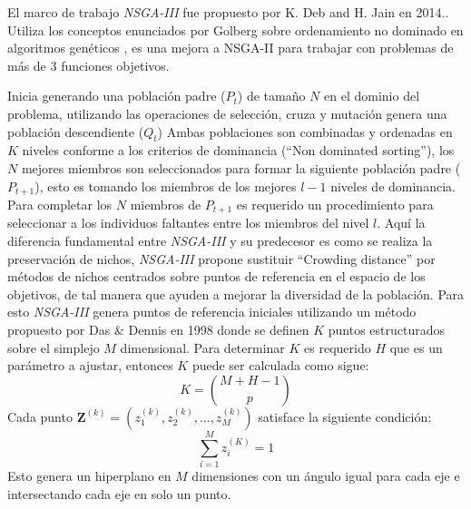\documentclass[letterpaper,10pt]{article}
\begin{document}
El marco de trabajo \emph{NSGA-III} fue propuesto por K. Deb and H. Jain en 2014.\cite{6600851}. Utiliza los conceptos enunciados por Golberg sobre ordenamiento no dominado en algoritmos genéticos \cite{goldberg1988genetic}
, es una mejora a NSGA-II para trabajar con problemas de más de $3$ funciones objetivos.

Inicia generando una población padre ($P_t$) de tamaño $N$ en el dominio del problema, utilizando las operaciones de selección, cruza y mutación genera una población descendiente ($Q_t$)
Ambas poblaciones son combinadas y ordenadas en $K$ niveles conforme a los criterios de dominancia (``Non dominated sorting''), los $N$ mejores miembros son seleccionados para formar
la siguiente población padre ($P_{t+1}$), esto es tomando los miembros de los mejores $l-1$ niveles de dominancia. Para completar los $N$ miembros de $P_{t+1}$ es requerido un procedimiento
para seleccionar a los individuos faltantes entre los miembros del nivel $l$. Aquí la diferencia fundamental entre \emph{NSGA-III} y su predecesor es como se realiza la preservación de nichos,
\emph{NSGA-III} propone sustituir ``Crowding distance'' por métodos de nichos centrados sobre puntos de referencia en el espacio de los objetivos, de tal manera que ayuden a mejorar la diversidad de la población. Para esto \emph{NSGA-III} genera puntos de referencia
iniciales utilizando un método propuesto por Das \& Dennis en 1998 \cite{Das:1998:NIN:588907.589322} donde se definen $K$ puntos estructurados sobre el simplejo $M$ dimensional.
Para determinar $K$ es requerido $H$ que es un parámetro a ajustar, entonces $K$ puede ser calculada como sigue:
  $$K= {M+H-1 \choose p}$$
Cada punto $\bm{Z}^{(k)}=(z_1^{(k)},z_2^{(k)}, \dots, z_M^{(k)})$ satisface la siguiente condición:
  $$\sum_{i=1}^M z_i^{(K)} = 1$$
Esto genera un hiperplano en $M$ dimensiones con un ángulo igual para cada eje e intersectando cada eje en solo un punto.
\end{document}
